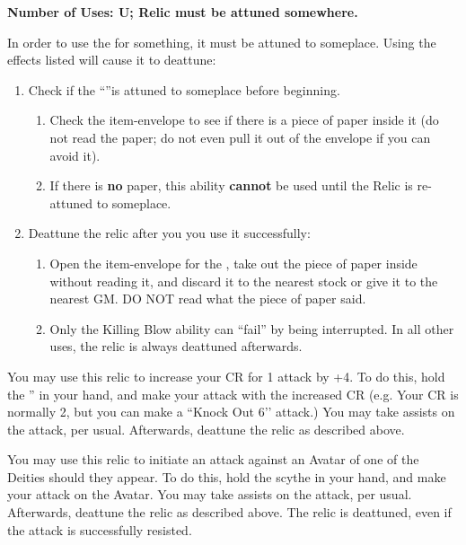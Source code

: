 \documentclass[green]{GL2020}
\begin{document}
\name{\gDeathRelic{}}

\textbf{Number of Uses: U; Relic must be attuned somewhere.}

In order to use the \iScythe{} for something, it must be attuned to someplace. Using the effects listed will cause it to deattune:
\begin{enumerate}
  \item Check if the ``\iScythe{}''is attuned to someplace before beginning.
  \begin{enumerate}
    \item Check the item-envelope to see if there is a piece of paper inside it (do not read the paper; do not even pull it out of the envelope if you can avoid it).
    \item If there is \textbf{no} paper, this ability \textbf{cannot} be used until the Relic is re-attuned to someplace.
  \end{enumerate}
  \item Deattune the relic after you you use it successfully:
  \begin{enumerate}
    \item Open the item-envelope for the \iScythe{}, take out the piece of paper inside without reading it, and discard it to the nearest stock or give it to the nearest GM. DO NOT read what the piece of paper said.
    \item Only the Killing Blow ability can ``fail'' by being interrupted. In all other uses, the relic is always deattuned afterwards.
    \end{enumerate}
\end{enumerate}

You may use this relic to increase your CR for 1 attack by +4. To do this, hold the \iScythe{}'' in your hand, and make your attack with the increased CR (e.g. Your CR is normally 2, but you can make a ``Knock Out 6’’ attack.) You may take assists on the attack, per usual. Afterwards, deattune the relic as described above.

You may use this relic to initiate an attack against an Avatar of one of the Deities should they appear. To do this, hold the scythe in your hand, and make your attack on the Avatar. You may take assists on the attack, per usual. Afterwards, deattune the relic as described above. The relic is deattuned, even if the attack is successfully resisted.
\end{document}
